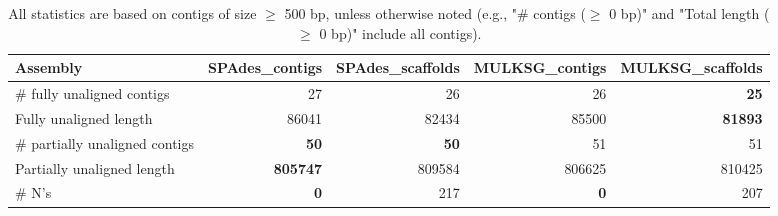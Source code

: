 \documentclass[12pt,a4paper]{article}
\begin{document}
\begin{table}[ht]
\begin{center}
\caption{All statistics are based on contigs of size $\geq$ 500 bp, unless otherwise noted (e.g., "\# contigs ($\geq$ 0 bp)" and "Total length ($\geq$ 0 bp)" include all contigs).}
\begin{tabular}{|l*{4}{|r}|}
\hline
Assembly & SPAdes\_contigs & SPAdes\_scaffolds & MULKSG\_contigs & MULKSG\_scaffolds \\ \hline
\# fully unaligned contigs & 27 & 26 & 26 & {\bf 25} \\ \hline
Fully unaligned length & 86041 & 82434 & 85500 & {\bf 81893} \\ \hline
\# partially unaligned contigs & {\bf 50} & {\bf 50} & 51 & 51 \\ \hline
Partially unaligned length & {\bf 805747} & 809584 & 806625 & 810425 \\ \hline
\# N's & {\bf 0} & 217 & {\bf 0} & 207 \\ \hline
\end{tabular}
\end{center}
\end{table}
\end{document}
